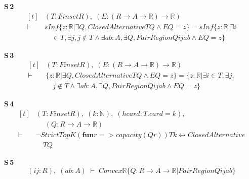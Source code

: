 \noindent\textbf{S\,2}\quad{}
{\footnotesize\[ \begin{aligned}[t]
&(\mathit{T} : \mathit{Finset} \mathit{R}),\; (\mathit{E} : (\mathit{R} \to \mathit{A} \to \mathbb{R} ) \to \mathbb{R} )\\
\vdash\;&\mathit{sInf} \{ \mathit{z} : \mathbb{R} | \exists \mathit{Q}, \mathit{ClosedAlternative} \mathit{T} \mathit{Q} \wedge \mathit{E} \mathit{Q} = \mathit{z}\} = \mathit{sInf} \{ \mathit{z} : \mathbb{R} | \exists \mathit{i}\\
&\quad \in \mathit{T}, \exists \mathit{j}, \mathit{j} \notin \mathit{T} \wedge \exists \mathit{a} \mathit{b} : \mathit{A}, \exists \mathit{Q}, \mathit{PairRegion} \mathit{Q} \mathit{i} \mathit{j} \mathit{a} \mathit{b} \wedge \mathit{E} \mathit{Q} = \mathit{z}\}
\end{aligned} \]}

\noindent\textbf{S\,3}\quad{}
{\footnotesize\[ \begin{aligned}[t]
&(\mathit{T} : \mathit{Finset} \mathit{R}),\; (\mathit{E} : (\mathit{R} \to \mathit{A} \to \mathbb{R} ) \to \mathbb{R} )\\
\vdash\;&\{ \mathit{z} : \mathbb{R} | \exists \mathit{Q}, \mathit{ClosedAlternative} \mathit{T} \mathit{Q} \wedge \mathit{E} \mathit{Q} = \mathit{z}\} = \{ \mathit{z} : \mathbb{R} | \exists \mathit{i} \in \mathit{T}, \exists \mathit{j},\\
&\quad \mathit{j} \notin \mathit{T} \wedge \exists \mathit{a} \mathit{b} : \mathit{A}, \exists \mathit{Q}, \mathit{PairRegion} \mathit{Q} \mathit{i} \mathit{j} \mathit{a} \mathit{b} \wedge \mathit{E} \mathit{Q} = \mathit{z}\}
\end{aligned} \]}

\noindent\textbf{S\,4}\quad{}
{\footnotesize\[ \begin{aligned}[t]
&(\mathit{T} : \mathit{Finset} \mathit{R}),\; (\mathit{k} : \mathbb{N} ),\; (\mathit{hcard} : \mathit{T}.\mathit{card} = \mathit{k}),\\
&\quad \; (\mathit{Q} : \mathit{R} \to \mathit{A} \to \mathbb{R} )\\
\vdash\;&\neg \mathit{StrictTopK} (\mathbf{fun} \mathit{r} => \mathit{capacity} (\mathit{Q} \mathit{r})) \mathit{T} \mathit{k} \leftrightarrow \mathit{ClosedAlternative}\\
&\quad \mathit{T} \mathit{Q}
\end{aligned} \]}

\noindent\textbf{S\,5}\quad{}
{\footnotesize\[ (\mathit{i} \mathit{j} : \mathit{R}),\; (\mathit{a} \mathit{b} : \mathit{A}) \;\vdash\; \mathit{Convex} \mathbb{R} \{ \mathit{Q} : \mathit{R} \to \mathit{A} \to \mathbb{R} | \mathit{PairRegion} \mathit{Q} \mathit{i} \mathit{j} \mathit{a} \mathit{b}\} \]}

